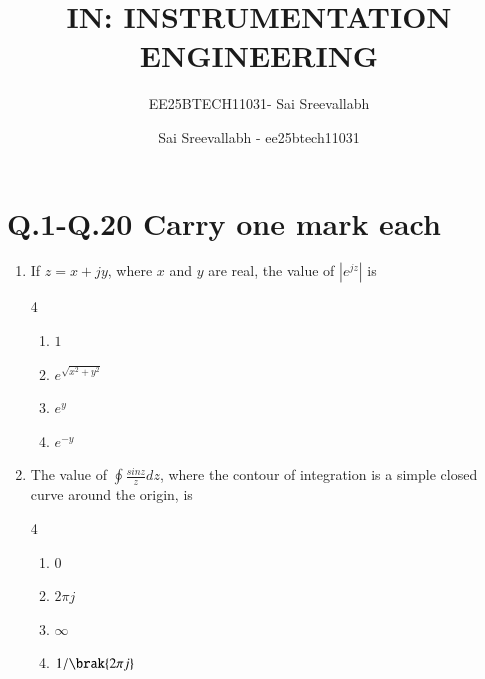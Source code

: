 \documentclass[journal,12pt,onecolumn]{IEEEtran}
\title{IN: INSTRUMENTATION ENGINEERING}
\author{EE25BTECH11031- Sai Sreevallabh}
\author{Sai Sreevallabh - ee25btech11031}
\theoremstyle{remark}
\begin{document}
\maketitle

\section*{\textbf{Q.1-Q.20 Carry one mark each}} %

\vspace{0.5cm} %

\begin{enumerate}
\item If $z=x+jy$, where $x$ and $y$ are real, the value of $|e^{jz}|$ is \par \hfill{}
\begin{multicols}{4}
    \begin{enumerate}
        \item $1$
        \item $e^{\sqrt{{x^{2}+y^{2}}}}$
        \item $e^{y}$
        \item $e^{-y}$
\end{enumerate}
\end{multicols}

\vspace{0.5 cm}

\item The value of $\oint\frac{sinz}{z}dz$, where the contour of integration is a simple closed curve around the origin, is \par \hfill{} 
\begin{multicols}{4}
    \begin{enumerate}
        \item $0$
        \item $2{\pi}j$
        \item $\infty$
        \item $1/\brak{2{\pi}j}$
\end{enumerate}
\end{multicols}


\end{enumerate}
\end{document}
